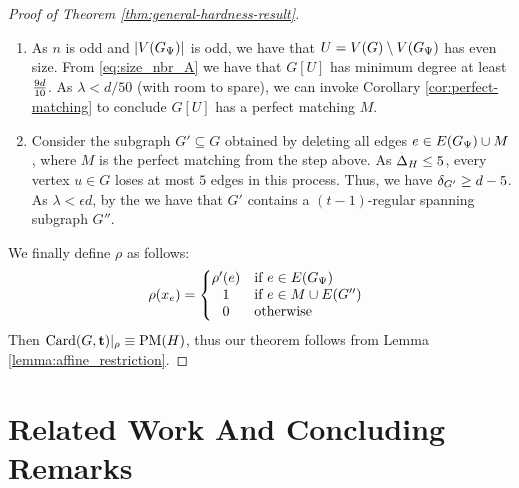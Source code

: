 \documentclass[11pt]{article}
\begin{document}
\begin{proof}[Proof of Theorem \ref{thm:general-hardness-result}]
\begin{enumerate}
\item{ As $n$ is odd and $|V(G_{\Psi})|$ is odd, we have that $U = V(G) \setminus V(G_{\Psi})$ has even size. From \eqref{eq:size_nbr_A} we have that $G[U]$ has minimum degree at least $\frac{9d}{10}$. As $\lambda < d/50$ (with room to spare), we can invoke Corollary \ref{cor:perfect-matching} to conclude $G[U]$ has a perfect matching $M$. 
}
  
\item{
  Consider the subgraph $G' \subseteq G$ obtained by deleting all edges $e \in E(G_{\Psi}) \cup M$, where $M$ is the perfect matching from the step above. As $\Delta_{H} \leq 5$, every vertex $u \in G$ loses at most $5$ edges in this process. Thus, we have $\delta_{G'} \ge d - 5$. As $\lambda < \epsilon d$, by the  we have that $G'$ contains a $(t-1)$-regular spanning subgraph $G''$. }

\end{enumerate}

We finally define $\rho$ as follows:
\[
\rho(x_e) =
\left\{
\begin{array}{@{}cl}
\rho'(e) & \text{if } e \in \Edges{G_{\EmbeddingFunc}} \\
1 & \text{if } e \in M \cup E(G'') \\
0 & \text{otherwise}
\end{array}
\right.
\]
Then $\text{Card}(G, \mathbf{t})|_\rho \equiv \text{PM}(H)$, thus our theorem follows from Lemma \ref{lemma:affine_restriction}.
\end{proof}


\section{Related Work And Concluding Remarks}
\label{sec:related-work}
\end{document}
